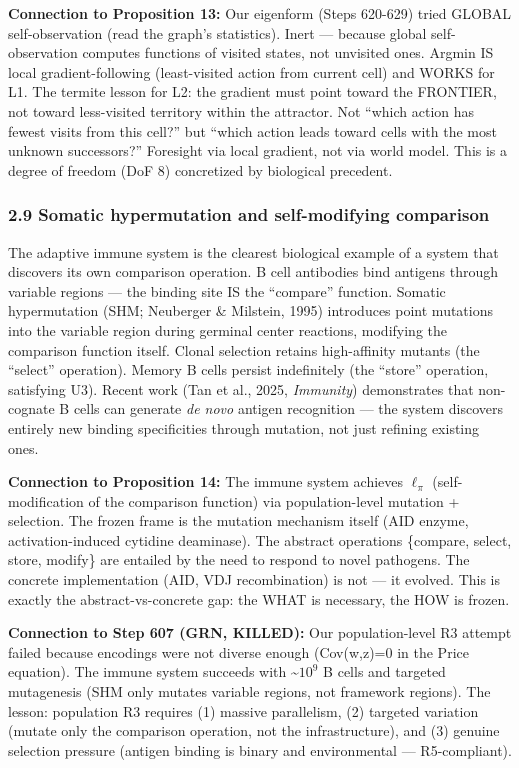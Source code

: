 \documentclass[
  11pt,
]{article}
\begin{document}
\textbf{Connection to Proposition 13:} Our eigenform (Steps 620-629)
tried GLOBAL self-observation (read the graph's statistics). Inert ---
because global self-observation computes functions of visited states,
not unvisited ones. Argmin IS local gradient-following (least-visited
action from current cell) and WORKS for L1. The termite lesson for L2:
the gradient must point toward the FRONTIER, not toward less-visited
territory within the attractor. Not ``which action has fewest visits
from this cell?'' but ``which action leads toward cells with the most
unknown successors?'' Foresight via local gradient, not via world model.
This is a degree of freedom (DoF 8) concretized by biological precedent.

\subsubsection{2.9 Somatic hypermutation and self-modifying
comparison}\label{somatic-hypermutation-and-self-modifying-comparison}

The adaptive immune system is the clearest biological example of a
system that discovers its own comparison operation. B cell antibodies
bind antigens through variable regions --- the binding site IS the
``compare'' function. Somatic hypermutation (SHM; Neuberger \& Milstein,
1995) introduces point mutations into the variable region during
germinal center reactions, modifying the comparison function itself.
Clonal selection retains high-affinity mutants (the ``select''
operation). Memory B cells persist indefinitely (the ``store''
operation, satisfying U3). Recent work (Tan et al., 2025,
\emph{Immunity}) demonstrates that non-cognate B cells can generate
\emph{de novo} antigen recognition --- the system discovers entirely new
binding specificities through mutation, not just refining existing ones.

\textbf{Connection to Proposition 14:} The immune system achieves
\(\ell_\pi\) (self-modification of the comparison function) via
population-level mutation + selection. The frozen frame is the mutation
mechanism itself (AID enzyme, activation-induced cytidine deaminase).
The abstract operations \{compare, select, store, modify\} are entailed
by the need to respond to novel pathogens. The concrete implementation
(AID, VDJ recombination) is not --- it evolved. This is exactly the
abstract-vs-concrete gap: the WHAT is necessary, the HOW is frozen.

\textbf{Connection to Step 607 (GRN, KILLED):} Our population-level R3
attempt failed because encodings were not diverse enough (Cov(w,z)=0 in
the Price equation). The immune system succeeds with
\textasciitilde{}\(10^9\) B cells and targeted mutagenesis (SHM only
mutates variable regions, not framework regions). The lesson: population
R3 requires (1) massive parallelism, (2) targeted variation (mutate only
the comparison operation, not the infrastructure), and (3) genuine
selection pressure (antigen binding is binary and environmental ---
R5-compliant).
\end{document}
